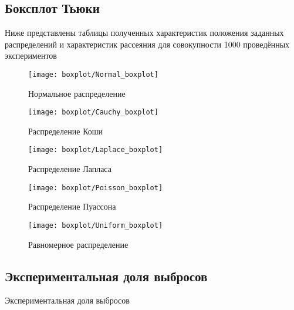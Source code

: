 \subsection{Боксплот Тьюки}
Ниже представлены таблицы полученных характеристик положения заданных распределений и характеристик рассеяния для совокупности 1000 проведённых экспериментов

\begin{figure}[H]
	\begin{center}
		\texttt{[image: boxplot/Normal\_boxplot]}
		\caption{Нормальное распределение}
		\label{pic:pic_name}
	\end{center}
\end{figure}


\begin{figure}[H]
	\begin{center}
		\texttt{[image: boxplot/Cauchy\_boxplot]}
		\caption{Распределение Коши}
		\label{pic:pic_name}
	\end{center}
\end{figure}


\begin{figure}[H]
	\begin{center}
		\texttt{[image: boxplot/Laplace\_boxplot]}
		\caption{Распределение Лапласа}
		\label{pic:pic_name}
	\end{center}
\end{figure}

\begin{figure}[H]
	\begin{center}
		\texttt{[image: boxplot/Poisson\_boxplot]}
		\caption{Распределение Пуассона}
		\label{pic:pic_name}
	\end{center}
\end{figure}

\begin{figure}[H]
	\begin{center}
		\texttt{[image: boxplot/Uniform\_boxplot]}
		\caption{Равномерное распределение}
		\label{pic:pic_name}
	\end{center}
\end{figure}

\subsection{Экспериментальная доля выбросов}

\begin{table}[H]
	\begin{center}
		
		\caption{Экспериментальная доля выбросов}
		\label{tabl:tabl_name}
	\end{center}
\end{table}


